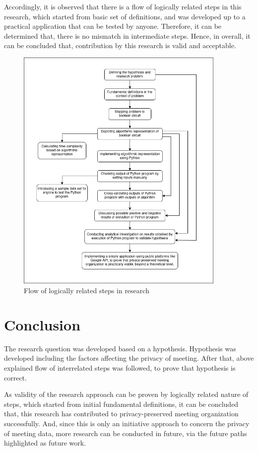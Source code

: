 \par Accordingly, it is observed that there is a flow of logically related steps in this research, which started from basic set of definitions, and was developed up to a practical application that can be tested by anyone. Therefore, it can be determined that, there is no mismatch in intermediate steps. Hence, in overall, it can be concluded that, contribution by this research is valid and acceptable.\\
\begin{figure}[H]
    \centering
    \includegraphics[width=0.9\textwidth]{./image/evaluation_flow.png}
    \caption{Flow of logically related steps in research}
    \label{fig:Flow of logically related steps in research}
\end{figure}

\section{Conclusion}
\indent \par The research question was developed based on a hypothesis. Hypothesis was developed including the factors affecting the privacy of meeting. After that, above explained flow of interrelated steps was followed, to prove that hypothesis is correct.\\
\par As validity of the research approach can be proven by logically related nature of steps, which started from initial fundamental definitions, it can be concluded that, this research has contributed to privacy-preserved meeting organization successfully. And, since this is only an initiative approach to concern the privacy of meeting data, more research can be conducted in future, via the future paths highlighted as future work.\\

